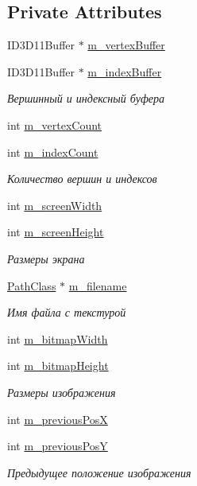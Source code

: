 \subsection*{Private Attributes}
\begin{DoxyCompactItemize}
\item 
I\+D3\+D11\+Buffer $\ast$ \hyperlink{class_bitmap_class_a790fde5c2a8616d0864ff7a2d9bec925}{m\+\_\+vertex\+Buffer}
\item 
I\+D3\+D11\+Buffer $\ast$ \hyperlink{class_bitmap_class_ad7d91aa389c9f2d65218fb91d6fc23f4}{m\+\_\+index\+Buffer}
\begin{DoxyCompactList}\small\item\em Вершинный и индексный буфера \end{DoxyCompactList}\item 
int \hyperlink{class_bitmap_class_a0e31d5e3c054945918cb5eb95f8938fd}{m\+\_\+vertex\+Count}
\item 
int \hyperlink{class_bitmap_class_a269728891a77e49af45401592e77fb1a}{m\+\_\+index\+Count}
\begin{DoxyCompactList}\small\item\em Количество вершин и индексов \end{DoxyCompactList}\item 
int \hyperlink{class_bitmap_class_a00a076a742e1d040a28c8b0967d3dc02}{m\+\_\+screen\+Width}
\item 
int \hyperlink{class_bitmap_class_ae113e895f269656e2f8221d1a3a4344e}{m\+\_\+screen\+Height}
\begin{DoxyCompactList}\small\item\em Размеры экрана \end{DoxyCompactList}\item 
\hyperlink{class_path_class}{Path\+Class} $\ast$ \hyperlink{class_bitmap_class_a34a1f6711f7c091e70707c3823f33d9c}{m\+\_\+filename}
\begin{DoxyCompactList}\small\item\em Имя файла с текстурой \end{DoxyCompactList}\item 
int \hyperlink{class_bitmap_class_a73d12c26aad0644d0a5ad7765a586c23}{m\+\_\+bitmap\+Width}
\item 
int \hyperlink{class_bitmap_class_ac80cf9ec61bc0eb44c4389083a206411}{m\+\_\+bitmap\+Height}
\begin{DoxyCompactList}\small\item\em Размеры изображения \end{DoxyCompactList}\item 
int \hyperlink{class_bitmap_class_af25371dd78b1fb38f9e50e976200bef6}{m\+\_\+previous\+PosX}
\item 
int \hyperlink{class_bitmap_class_a60274b76e941d1f8e77cf01b25ed31f5}{m\+\_\+previous\+PosY}
\begin{DoxyCompactList}\small\item\em Предыдущее положение изображения \end{DoxyCompactList}\end{DoxyCompactItemize}


